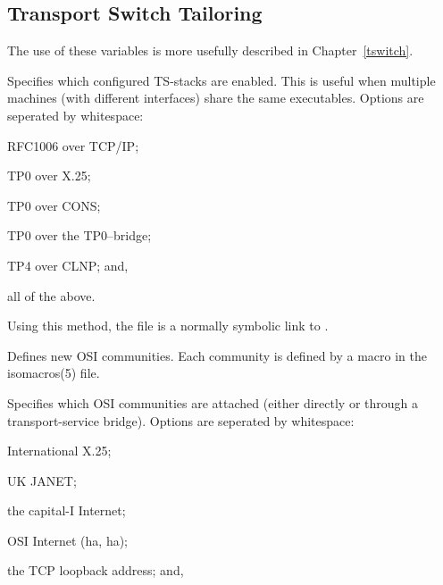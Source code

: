 \subsection	{Transport Switch Tailoring}
The use of these variables is more usefully described in Chapter~\ref{tswitch}.
\begin{describe}
\item[\verb"ts\_stacks":] Specifies which configured TS-stacks are
enabled.
This is useful when multiple machines (with different interfaces)
share the same executables.
Options are seperated by whitespace:
\begin{describe}
\item[\verb"tcp":] RFC1006 over TCP/IP;

\item[\verb"x25":] TP0 over X.25;

\item[\verb"cons":] TP0 over CONS;

\item[\verb"bridge":] TP0 over the TP0--bridge;

\item[\verb"tp4":] TP4 over CLNP;
and,

\item[\verb"all":] all of the above.
\end{describe}
Using this method,
the  file is a normally symbolic link to
.

\item[\verb"ts\_interim":] Defines new OSI communities.
Each community is defined by a macro in the \file isomacros(5) file.

\item[\verb"ts\_communities":] Specifies which OSI communities are attached
(either directly or through a transport-service bridge).
Options are seperated by whitespace:
\begin{describe}
\item[\verb"int-x25":] International X.25;

\item[\verb"janet":] UK JANET;

\item[\verb"internet":] the capital-I Internet;

\item[\verb"realns":] OSI Internet (ha, ha);

\item[\verb"localTCP":] the TCP loopback address;
and,


\end{describe}
\end{describe}
